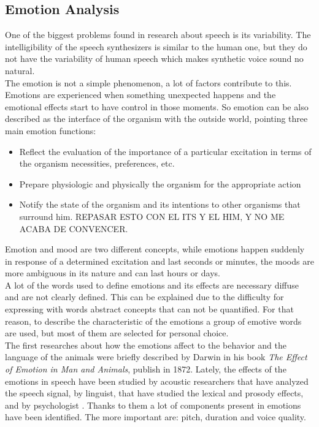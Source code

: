 \subsection{Emotion Analysis}\label{emotana}
One of the biggest problems found in research about speech is its variability. The intelligibility of the speech synthesizers is similar to the human one, but they do not have the variability of human speech which makes synthetic voice sound no natural.\\
The emotion is not a simple phenomenon, a lot of factors contribute to this.\\
Emotions are experienced when something unexpected happens and the emotional effects start to have control in those moments. So emotion can be also described as the interface of the organism with the outside world, pointing three main emotion functions:
\begin{itemize}
 \item Reflect the evaluation of the importance of a particular excitation in terms of the organism necessities, preferences, etc.
 \item Prepare physiologic and physically the organism for the appropriate action
 \item Notify the state of the organism and its intentions to other organisms that surround him. REPASAR ESTO CON EL ITS Y EL HIM, Y NO ME ACABA DE CONVENCER.
\end{itemize}
Emotion and mood are two different concepts, while emotions happen suddenly in response of a determined excitation and last seconds or minutes, the moods are more ambiguous in its nature and can last hours or days.\\
A lot of the words used to define emotions and its effects are necessary diffuse and are not clearly defined. This can be explained due to the difficulty for expressing with words abstract concepts that can not be quantified. For that reason, to describe the characteristic  of the emotions a group of emotive words are used, but most of them are selected for personal choice.\\
The first researches about how the emotions affect to the behavior and the language of the animals were briefly described by Darwin in his book \textit{The Effect of Emotion in Man and Animals}, publish in 1872. Lately, the effects of the emotions in speech have been studied by acoustic researchers that have analyzed the speech signal, by linguist, that have studied the lexical and prosody effects, and by psychologist . Thanks to them a lot of components present in emotions have been identified. The more important are: pitch, duration and voice quality.\\
